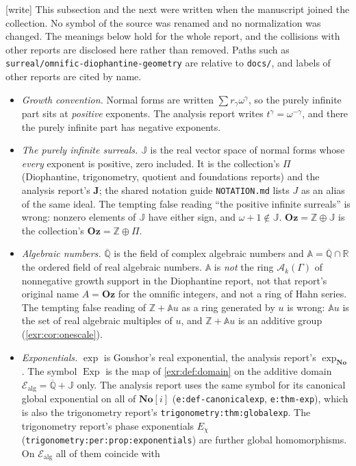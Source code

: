 \documentclass[11pt,letterpaper]{article}
\numberwithin{equation}{section}
\theoremstyle{definition}
\theoremstyle{remark}
\newcommand{\No}{\mathbf{No}}
\newcommand{\Oz}{\mathbf{Oz}}
\newcommand{\SC}{\mathbf{No}[i]}
\newcommand{\Z}{\mathbb Z}
\newcommand{\R}{\mathbb R}
\newcommand{\A}{\mathbb A}
\newcommand{\Qb}{\overline{\mathbb Q}}
\newcommand{\J}{\mathbb J}
\newcommand{\Ealg}{\mathcal E_{\mathrm{alg}}}
\newcommand{\Exp}{\operatorname{Exp}}
\newcommand{\rpath}[1]{\nolinkurl{#1}}%
\newcommand{\lbl}[1]{\nolinkurl{#1}}%
\newcommand{\wtag}{\textup{[write]}}%
\begin{document}
\wtag{} This subsection and the next were written when the manuscript
joined the collection. No symbol of the source was renamed and no
normalization was changed. The meanings below hold for the whole report, and
the collisions with other reports are disclosed here rather than removed.
Paths such as \rpath{surreal/omnific-diophantine-geometry} are relative to
\rpath{docs/}, and labels of other reports are cited by name.
\begin{itemize}[leftmargin=*,itemsep=3pt]
\item \emph{Growth convention.} Normal forms are written
$\sum r_\gamma\omega^\gamma$, so the purely infinite part sits at
\emph{positive} exponents. The analysis report writes
$t^\gamma=\omega^{-\gamma}$, and there the purely infinite part has
negative exponents.
\item \emph{The purely infinite surreals.} $\J$ is the real vector space of
normal forms whose \emph{every} exponent is positive, zero included. It is
the collection's $\Pi$ (Diophantine, trigonometry, quotient and foundations
reports) and the analysis report's $\mathbf J$; the shared notation guide
\rpath{NOTATION.md} lists $J$ as an alias of the same ideal. The tempting
false reading ``the positive infinite surreals'' is wrong: nonzero elements
of $\J$ have either sign, and $\omega+1\notin\J$. $\Oz=\Z\oplus\J$ is the
collection's $\Oz=\Z\oplus\Pi$.
\item \emph{Algebraic numbers.} $\Qb$ is the field of complex algebraic
numbers and $\A=\Qb\cap\R$ the ordered field of real algebraic numbers. $\A$
is \emph{not} the ring $\mathcal A_k(\Gamma)$ of nonnegative growth support in
the Diophantine report, not that report's original name $A=\Oz$ for the
omnific integers, and not a ring of Hahn series. The tempting false reading of
$\Z+\A u$ as a ring generated by $u$ is wrong: $\A u$ is the set of real
algebraic multiples of $u$, and $\Z+\A u$ is an additive group
(\cref{exr:cor:onescale}).
\item \emph{Exponentials.} $\exp$ is Gonshor's real exponential, the
analysis report's $\exp_{\No}$. The symbol $\Exp$ is the map of
\cref{exr:def:domain} on the additive domain $\Ealg=\Qb+\J$ only. The
analysis report uses the same symbol for its canonical global exponential on
all of $\SC$ (\lbl{e:def-canonicalexp}, \lbl{e:thm-exp}), which is also the
trigonometry report's \lbl{trigonometry:thm:globalexp}. The trigonometry
report's phase exponentials $E_\chi$ (\lbl{trigonometry:per:prop:exponentials})
are further global homomorphisms. On $\Ealg$ all of them coincide with

\end{itemize}
\end{document}
